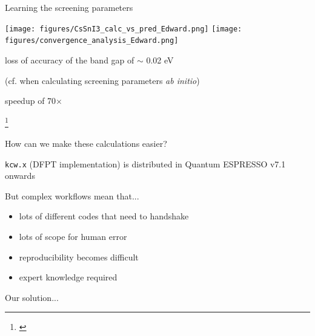 \documentclass[xcolor=table,aspectratio=169]{beamer}
\newcommand\blfootcite[1]{%
  \begingroup
  \renewcommand\thefootnote{}\footnote{\hspace{-4ex}\cite{#1}}%
  \addtocounter{footnote}{-1}%
  \endgroup
}
\numberwithin{equation}{section}
\begin{document}
\begin{frame}{Learning the screening parameters}
   \begin{center}

      \texttt{[image: figures/CsSnI3\_calc\_vs\_pred\_Edward.png]}
      \texttt{[image: figures/convergence\_analysis\_Edward.png]}

      loss of accuracy of the band gap of $\sim$ 0.02 eV

      (cf. when calculating screening parameters \emph{ab initio})

      speedup of 70$\times$
   \end{center}

   \blfootcite{Schubert2022}

\end{frame}

\begin{frame}{How can we make these calculations easier?}

   \texttt{kcw.x} (DFPT implementation) is distributed in Quantum ESPRESSO v7.1 onwards

   \vspace{4ex}

   But complex workflows mean that...
   \begin{itemize}
      \item lots of different codes that need to handshake
      \item lots of scope for human error
      \item reproducibility becomes difficult
      \item expert knowledge required
   \end{itemize}

   Our solution...

\end{frame}
\end{document}
